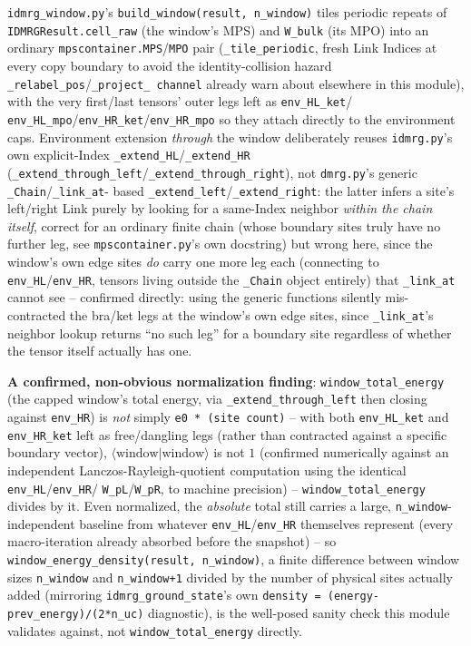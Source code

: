 \documentclass[11pt]{article}
\begin{document}
\texttt{idmrg\_window.py}'s \texttt{build\_window(result, n\_window)}
tiles periodic repeats of \texttt{IDMRGResult.cell\_raw} (the
window's MPS) and \texttt{W\_bulk} (its MPO) into an ordinary
\texttt{mpscontainer.MPS}/\texttt{MPO} pair (\texttt{\_tile\_periodic},
fresh Link Indices at every copy boundary to avoid the
identity-collision hazard \texttt{\_relabel\_pos}/\texttt{\_project\_
channel} already warn about elsewhere in this module), with the very
first/last tensors' outer legs left as \texttt{env\_HL\_ket}/
\texttt{env\_HL\_mpo}/\texttt{env\_HR\_ket}/\texttt{env\_HR\_mpo} so
they attach directly to the environment caps. Environment extension
\emph{through} the window deliberately reuses \texttt{idmrg.py}'s own
explicit-Index \texttt{\_extend\_HL}/\texttt{\_extend\_HR}
(\texttt{\_extend\_through\_left}/\texttt{\_extend\_through\_right}),
not \texttt{dmrg.py}'s generic \texttt{\_Chain}/\texttt{\_link\_at}-
based \texttt{\_extend\_left}/\texttt{\_extend\_right}: the latter
infers a site's left/right Link purely by looking for a same-Index
neighbor \emph{within the chain itself}, correct for an ordinary
finite chain (whose boundary sites truly have no further leg, see
\texttt{mpscontainer.py}'s own docstring) but wrong here, since the
window's own edge sites \emph{do} carry one more leg each (connecting
to \texttt{env\_HL}/\texttt{env\_HR}, tensors living outside the
\texttt{\_Chain} object entirely) that \texttt{\_link\_at} cannot see --
confirmed directly: using the generic functions silently
mis-contracted the bra/ket legs at the window's own edge sites, since
\texttt{\_link\_at}'s neighbor lookup returns ``no such leg'' for a
boundary site regardless of whether the tensor itself actually has one.

\textbf{A confirmed, non-obvious normalization finding}:
\texttt{window\_total\_energy} (the capped window's total energy, via
\texttt{\_extend\_through\_left} then closing against
\texttt{env\_HR}) is \emph{not} simply \texttt{e0 * (site count)} --
with both
\texttt{env\_HL\_ket} and \texttt{env\_HR\_ket} left as free/dangling
legs (rather than contracted against a specific boundary vector),
$\langle\text{window}|\text{window}\rangle$ is not $1$ (confirmed
numerically against an independent Lanczos-Rayleigh-quotient
computation using the identical \texttt{env\_HL}/\texttt{env\_HR}/
\texttt{W\_pL}/\texttt{W\_pR}, to machine precision) --
\texttt{window\_total\_energy} divides by it. Even normalized, the
\emph{absolute} total still carries a large, \texttt{n\_window}-
independent baseline from whatever \texttt{env\_HL}/\texttt{env\_HR}
themselves represent (every macro-iteration already absorbed before
the snapshot) -- so \texttt{window\_energy\_density(result,
n\_window)}, a finite difference between window sizes
\texttt{n\_window} and \texttt{n\_window+1} divided by the number of
physical sites actually added
(mirroring \texttt{idmrg\_ground\_state}'s own
\texttt{density = (energy-prev\_energy)/(2*n\_uc)} diagnostic), is the
well-posed sanity check this module validates against, not
\texttt{window\_total\_energy} directly.
\end{document}

